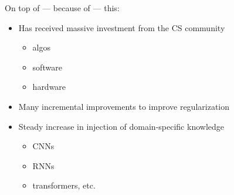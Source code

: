 \begin{frame}

    On top of --- because of --- this:
    
        \vspace{0.5em}
    \begin{itemize}
        \item Has received massive investment from the CS community
            \begin{itemize}
                \vspace{0.3em}
                \item algos
                \vspace{0.3em}
                \item software
                \vspace{0.3em}
                \item hardware
            \end{itemize}
        \vspace{0.5em}
        \item Many incremental improvements to improve regularization 
        \vspace{0.5em}
        \item Steady increase in injection of domain-specific knowledge
            \begin{itemize}
                \vspace{0.3em}
                \item CNNs
                \vspace{0.3em}
                \item RNNs
                \vspace{0.3em}
                \item transformers, etc.
            \end{itemize}
    \end{itemize}

\end{frame}





